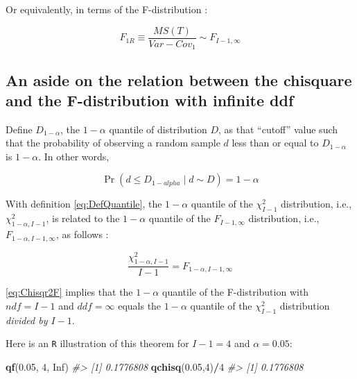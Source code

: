 \documentclass[
]{book}
\newenvironment{Shaded}{\begin{snugshade}}{\end{snugshade}}
\newcommand{\CommentTok}[1]{\textcolor[rgb]{0.56,0.35,0.01}{\textit{#1}}}
\newcommand{\DecValTok}[1]{\textcolor[rgb]{0.00,0.00,0.81}{#1}}
\newcommand{\FloatTok}[1]{\textcolor[rgb]{0.00,0.00,0.81}{#1}}
\newcommand{\KeywordTok}[1]{\textcolor[rgb]{0.13,0.29,0.53}{\textbf{#1}}}
\newcommand{\NormalTok}[1]{#1}
\newcommand{\OperatorTok}[1]{\textcolor[rgb]{0.81,0.36,0.00}{\textbf{#1}}}
\newcommand{\OtherTok}[1]{\textcolor[rgb]{0.56,0.35,0.01}{#1}}
\begin{document}
Or equivalently, in terms of the F-distribution \citep{RN1772}:

\begin{equation}
F_{1R} \equiv \frac{MS(T)}{Var-Cov_1} \sim F_{I-1, \infty}
\label{eq:DefF1RMT}
\end{equation}

\hypertarget{an-aside-on-the-relation-between-the-chisquare-and-the-f-distribution-with-infinite-ddf}{%
\subsection{An aside on the relation between the chisquare and the F-distribution with infinite ddf}\label{an-aside-on-the-relation-between-the-chisquare-and-the-f-distribution-with-infinite-ddf}}

Define \(D_{1-\alpha}\), the \(1-\alpha\) quantile of distribution \(D\), as that ``cutoff'' value such that the probability of observing a random sample \(d\) less than or equal to \(D_{1-\alpha}\) is \(1-\alpha\). In other words,

\begin{equation}
\Pr(d\leq D_{1-alpha} \mid d \sim D)=1-\alpha
\label{eq:DefQuantile}
\end{equation}

With definition \eqref{eq:DefQuantile}, the \(1-\alpha\) quantile of the \(\chi_{I-1}^2\) distribution, i.e., \(\chi_{1-\alpha,I-1}^2\), is related to the \(1-\alpha\) quantile of the \(F_{I-1,\infty}\) distribution, i.e., \(F_{1-\alpha,I-1,\infty}\), as follows \citep[see][Eq. 22]{RN1772}:

\begin{equation}
\frac{\chi_{1-\alpha,I-1}^{2}}{I-1} = F_{1-\alpha,I-1,\infty}
\label{eq:Chisqr2F}
\end{equation}

\eqref{eq:Chisqr2F} implies that the \(1-\alpha\) quantile of the F-distribution with \(ndf=I-1\) and \(ddf=\infty\) equals the \(1-\alpha\) quantile of the \(\chi_{I-1}^2\) distribution \emph{divided by \(I-1\)}.

Here is an \texttt{R} illustration of this theorem for \(I-1 = 4\) and \(\alpha = 0.05\):

\begin{Shaded}
\begin{Highlighting}[]
\KeywordTok{qf}\NormalTok{(}\FloatTok{0.05}\NormalTok{, }\DecValTok{4}\NormalTok{, }\OtherTok{Inf}\NormalTok{)}
\CommentTok{\#\textgreater{} [1] 0.1776808}
\KeywordTok{qchisq}\NormalTok{(}\FloatTok{0.05}\NormalTok{,}\DecValTok{4}\NormalTok{)}\OperatorTok{/}\DecValTok{4}
\CommentTok{\#\textgreater{} [1] 0.1776808}
\end{Highlighting}
\end{Shaded}
\end{document}
